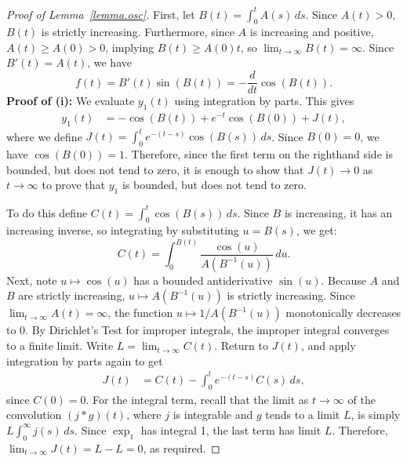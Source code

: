 \documentclass[10pt,reqno]{amsart}
\theoremstyle{definition}
\begin{document}
\begin{proof}[Proof of Lemma~\ref{lemma.osc}]
	First, let $B(t) = \int_0^t A(s) \, ds$. Since $A(t) > 0$, $B(t)$ is strictly increasing. Furthermore, since $A$ is increasing and positive, $A(t) \ge A(0) > 0$, implying $B(t) \ge A(0)t$, so $\lim_{t \to \infty} B(t) = \infty$. 
	Since $B'(t) = A(t)$, we have 
	\[
	f(t) = B'(t)\sin(B(t)) = -\frac{d}{dt}\cos(B(t)).
	\]
	\textbf{Proof of (i):} 	We evaluate $y_1(t)$ using integration by parts. %
	This gives
	\begin{align*}
		y_1(t) %
		&= -\cos(B(t)) + e^{-t}\cos(B(0)) + J(t),
	\end{align*}
	where we define $J(t) = \int_0^t e^{-(t-s)}\cos(B(s)) \, ds$. Since $B(0) = 0$, we have $\cos(B(0)) = 1$. Therefore, since the first term on the righthand side is bounded, but does not tend to zero, it is enough to show that $J(t)\to 0$ as $t\to\infty$ to prove that $y_1$ is bounded, but does not tend to zero. 
	
	To do this define $C(t) = \int_0^t \cos(B(s)) \, ds$. Since $B$ is increasing, it has an increasing inverse, so integrating by substituting  $u = B(s)$, %
	we get:
	\[
	C(t) = \int_0^{B(t)} \frac{\cos(u)}{A(B^{-1}(u))} \, du.
	\]
	Next, note $u\mapsto \cos(u)$ has a bounded antiderivative $\sin(u)$. Because $A$ and $B$ are strictly increasing, $u \mapsto A(B^{-1}(u))$ is strictly increasing. Since $\lim_{t \to \infty} A(t) = \infty$, the function $u\mapsto 1/A(B^{-1}(u))$ monotonically decreases to $0$. By Dirichlet's Test for improper integrals, the improper integral converges to a finite limit. Write $L=\lim_{t \to \infty} C(t)$.
	Return to $J(t)$, and apply integration by parts again to get %
	\begin{align*}
		J(t) 
		&= C(t) - \int_0^t e^{-(t-s)} C(s) \, ds,
	\end{align*}
	since $C(0) = 0$. For the integral term, recall that the limit as $t\to\infty$ of the convolution $(j\ast g)(t)$, where $j$ is integrable and  $g$ tends to a limit $L$, is simply $L\int_0^\infty j(s)\,ds$. Since $\exp_1$ has integral 1, the last term has limit $L$. 
	Therefore, $\lim_{t \to \infty} J(t) = L - L = 0$, as required. 
	

\end{proof}
\end{document}
